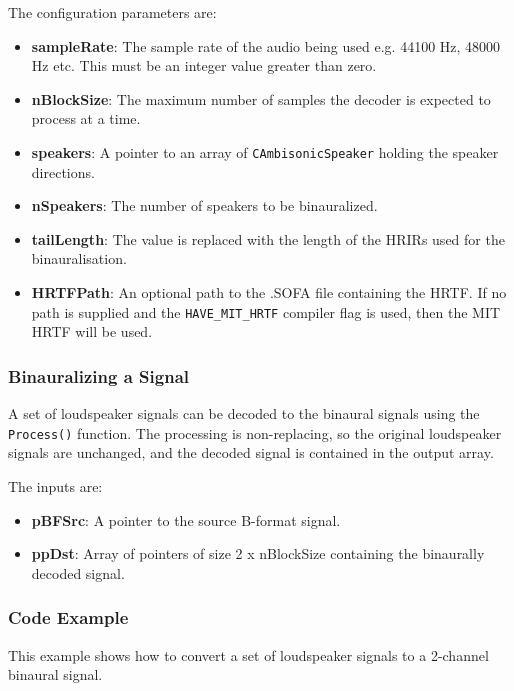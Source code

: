 \documentclass[12pt]{report}
\newcommand{\code}[1]{\texttt{#1}}
\begin{document}
The configuration parameters are:
\begin{itemize}
    \item \textbf{sampleRate}: The sample rate of the audio being used e.g. 44100 Hz, 48000 Hz etc. This must be an integer value greater than zero.
    \item \textbf{nBlockSize}: The maximum number of samples the decoder is expected to process at a time.
    \item \textbf{speakers}: A pointer to an array of \code{CAmbisonicSpeaker} holding the speaker directions.
    \item \textbf{nSpeakers}: The number of speakers to be binauralized.
    \item \textbf{tailLength}: The value is replaced with the length of the HRIRs used for the binauralisation.
    \item \textbf{HRTFPath}: An optional path to the .SOFA file containing the HRTF. If no path is supplied and the \code{HAVE\_MIT\_HRTF} compiler flag is used, then the MIT HRTF will be used.
\end{itemize}

\subsubsection{Binauralizing a Signal}

A set of loudspeaker signals can be decoded to the binaural signals using the \code{Process()} function. The processing is non-replacing, so the original loudspeaker signals are unchanged, and the decoded signal is contained in the output array.

The inputs are:
\begin{itemize}
    \item \textbf{pBFSrc}: A pointer to the source B-format signal.
    \item \textbf{ppDst}: Array of pointers of size 2 x nBlockSize containing the binaurally decoded signal.
\end{itemize}

\subsubsection{Code Example}

This example shows how to convert a set of loudspeaker signals to a 2-channel binaural signal.
\end{document}
